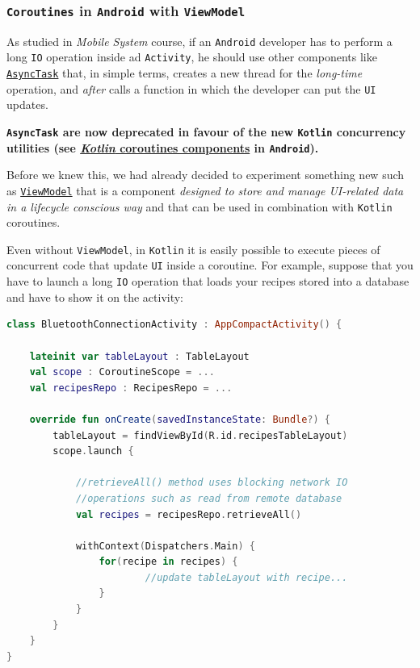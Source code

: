 \subsubsection{\texttt{Coroutines} in \texttt{Android} with \texttt{ViewModel}}

As studied in \textit{Mobile System} course, if an \texttt{Android} developer has to perform a long \texttt{IO} operation inside ad \texttt{Activity}, he should use other components like \href{https://developer.android.com/reference/android/os/AsyncTask}{\texttt{AsyncTask}} that, in simple terms, creates a new thread for the \textit{long-time} operation, and \textit{after} calls a function in which the developer can put the \texttt{UI} updates.

\begin{tcolorbox}[colback=red!5!white,colframe=red!75!black]
	\begin{center}
		\textbf{\texttt{AsyncTask} are now deprecated in favour of the new \texttt{Kotlin} concurrency utilities (see \href{https://developer.android.com/topic/libraries/architecture/coroutines}{\textit{Kotlin} coroutines components} in \texttt{Android}).}
	\end{center}
\end{tcolorbox}

Before we knew this, we had already decided to experiment something new such as \href{https://developer.android.com/topic/libraries/architecture/viewmodel}{\texttt{ViewModel}} that is a component \textit{designed to store and manage UI-related data in a lifecycle conscious way} and that can be used in combination with \texttt{Kotlin} coroutines.

Even without \texttt{ViewModel}, in \texttt{Kotlin} it is easily possible to execute pieces of concurrent code that update \texttt{UI} inside a coroutine. For example, suppose that you have to launch a long \texttt{IO} operation that loads your recipes stored into a database and have to show it on the activity:

\begin{lstlisting}[language=Kotlin]
class BluetoothConnectionActivity : AppCompactActivity() {
	
	lateinit var tableLayout : TableLayout
	val scope : CoroutineScope = ...
	val recipesRepo : RecipesRepo = ...
	
	override fun onCreate(savedInstanceState: Bundle?) {
		tableLayout = findViewById(R.id.recipesTableLayout)
		scope.launch {
			
			//retrieveAll() method uses blocking network IO
			//operations such as read from remote database
			val recipes = recipesRepo.retrieveAll()
			
			withContext(Dispatchers.Main) {
				for(recipe in recipes) {
						//update tableLayout with recipe...
				}
			}
		}
	}
}
\end{lstlisting}


